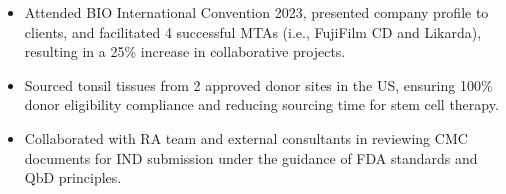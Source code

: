 \begin{itemize}
    \setlength{\itemindent}{0.5em}
    \item \small 
    Attended BIO International Convention 2023, presented company profile to clients, and facilitated 4 successful MTAs (i.e., FujiFilm CD and Likarda), 
    resulting in a 25\% increase in collaborative projects.
    \item Sourced tonsil tissues from 2 approved donor sites in the US, ensuring 100\% donor eligibility compliance and reducing sourcing time for stem cell therapy. 
    \item Collaborated with RA team and external consultants in reviewing CMC documents for IND submission under the guidance of FDA standards and QbD principles.

\end{itemize}




